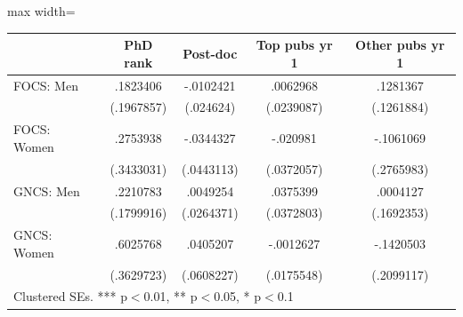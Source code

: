 \begin{adjustbox}{max width=\textwidth}
\begin{tabular}{lcccc}
\toprule
 & PhD rank & Post-doc & Top pubs yr 1 & Other pubs yr 1 \\
\midrule
FOCS: Men & .1823406 & -.0102421 & .0062968 & .1281367 \\
 & (.1967857) & (.024624) & (.0239087) & (.1261884) \\[0.3em]
FOCS: Women & .2753938 & -.0344327 & -.020981 & -.1061069 \\
 & (.3433031) & (.0443113) & (.0372057) & (.2765983) \\[0.3em]
GNCS: Men & .2210783 & .0049254 & .0375399 & .0004127 \\
 & (.1799916) & (.0264371) & (.0372803) & (.1692353) \\[0.3em]
GNCS: Women & .6025768 & .0405207 & -.0012627 & -.1420503 \\
 & (.3629723) & (.0608227) & (.0175548) & (.2099117) \\[0.3em]
\bottomrule
\multicolumn{5}{l}{\footnotesize Clustered SEs. *** p$<$0.01, ** p$<$0.05, * p$<$0.1} \\
\end{tabular}
\end{adjustbox}
